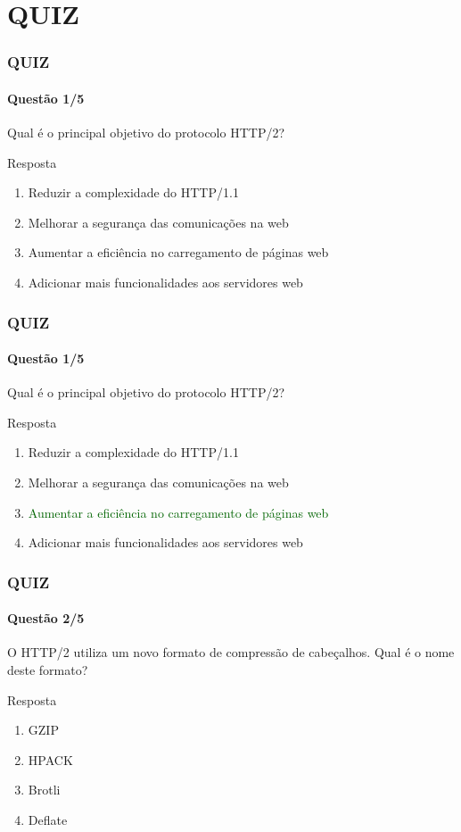 \documentclass[
	9pt, %
	t, %
]{beamer}
\begin{document}
\section{QUIZ}

\begin{frame}
	\frametitle{QUIZ}
	\framesubtitle{Questão 1/5}

	{\Large Qual é o principal objetivo do protocolo HTTP/2? }

	\begin{exampleblock}{Resposta}
		\begin{enumerate}[a]
			\item Reduzir a complexidade do HTTP/1.1
			\item Melhorar a segurança das comunicações na web
			\item Aumentar a eficiência no carregamento de páginas web
			\item Adicionar mais funcionalidades aos servidores web
		\end{enumerate}
	\end{exampleblock}

\end{frame}

\begin{frame}
	\frametitle{QUIZ}
	\framesubtitle{Questão 1/5}

	{\Large Qual é o principal objetivo do protocolo HTTP/2? }

	\begin{exampleblock}{Resposta}
		\begin{enumerate}[a]
			\item Reduzir a complexidade do HTTP/1.1
			\item Melhorar a segurança das comunicações na web
			\item \textcolor{darkgreen}{Aumentar a eficiência no carregamento de páginas web}
			\item Adicionar mais funcionalidades aos servidores web
		\end{enumerate}
	\end{exampleblock}

\end{frame}

\begin{frame}
	\frametitle{QUIZ}
	\framesubtitle{Questão 2/5}

	{\Large O HTTP/2 utiliza um novo formato de compressão de cabeçalhos. Qual é o nome deste formato? }

	\begin{exampleblock}{Resposta}
		\begin{enumerate}[a]
			\item GZIP
			\item HPACK
			\item Brotli
			\item Deflate
		\end{enumerate}
	\end{exampleblock}

\end{frame}
\end{document}
